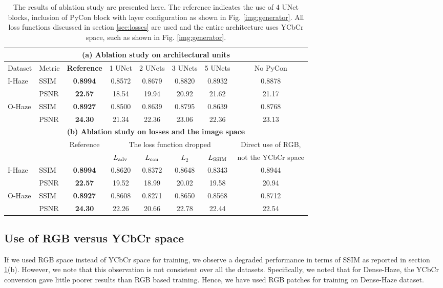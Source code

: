 \documentclass[runningheads]{llncs}
\begin{document}
\begin{table}[t]
\centering
\caption{The results of ablation study are presented here. The reference indicates the use of 4 UNet blocks, inclusion of PyCon block with layer configuration as shown in Fig. \ref{img:generator}. All loss functions discussed in section \ref{sec:losses} are used and the entire architecture uses YCbCr space, such as shown in Fig. \ref{img:generator}.}
\label{tab:abl1}
\begin{tabular}{|l|l||c|c|c|c|c|c|}
\hline
\multicolumn{8}{|c|}{\textbf{(a) Ablation study on architectural units}}\\
\hline
{Dataset}& {Metric}&\textbf{Reference}&{1 UNet}&{2 UNets}&{3 UNets}&{5 UNets} &{No PyCon}\\
\hline
\hline
I-Haze & SSIM & \textbf{0.8994} & 0.8572 & 0.8679 & 0.8820 & {0.8932} & {0.8878}\\
\cline{2-8}
& PSNR & \textbf{22.57} & 18.54 & 19.94 & 20.92 & {21.62} & 21.17 \\
\hline
O-Haze & SSIM & \textbf{0.8927} & 0.8500 & 0.8639 & 0.8795 & {0.8639} & {0.8768}\\
\cline{2-8}
& PSNR & \textbf{24.30} & 21.34 & 22.36 & 23.06 & {22.36} & 23.13 \\
\hline
\hline
\multicolumn{8}{|c|}{\textbf {(b) Ablation study on losses and the image space}}\\
\hline
{}&{}&{Reference}&\multicolumn{4}{|c||}{The loss function dropped} & Direct use of RGB,\\
\cline{4-7}
{}&{}&{}&{$L_{\rm {adv}}$}&{$L_{\rm con}$}&{$L_{2}$}&{$L_{\rm SSIM}$} &{not the YCbCr space}\\
\hline
\hline
I-Haze & SSIM & \textbf{0.8994} & {0.8620} & {0.8372} & {0.8648} & {0.8343} & {0.8944}\\
\cline{2-8}
{} & PSNR & \textbf{22.57} & {19.52} & {18.99} & {20.02} & {19.58} & 20.94\\
\hline
O-Haze & SSIM & \textbf{0.8927} & {0.8608} & {0.8271} & {0.8650} & {0.8568} & {0.8712}\\
\cline{2-8}
{} & PSNR & \textbf{24.30} & {22.26} & {20.66} & {22.78} & {22.44} & 22.54\\
\hline
\end{tabular}
\end{table}

\subsection{Use of RGB versus YCbCr space} \label{sec:rgb_experiment}
If we used RGB space instead of YCbCr space for training, we observe a degraded performance in terms of SSIM as reported in section \ref{tab:abl1}(b). However, we note that this observation is not consistent over all the datasets. Specifically, we noted that for Dense-Haze, the YCbCr conversion gave little poorer results than RGB based training. Hence, we have used RGB patches for training on Dense-Haze dataset. 
\end{document}
